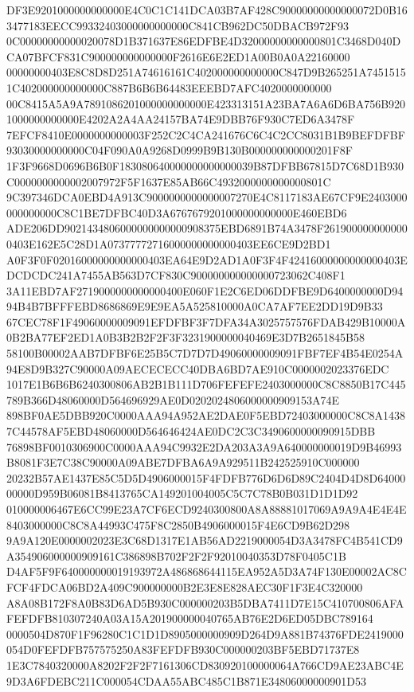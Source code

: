 \documentclass[UTF8,fontset=fandol,zihao=-4,a4paper]{ctexart}
\begin{document}
{{DF3E9201000000000000E4C0C1C141DCA03B7AF428C90000000000000072D0B163477183EECC99332403000000000000C841CB962DC50DBACB972F93
0C00000000000020078D1B371637E86EDFBE4D32000000000000801C3468D040DCA07BFCF831C900000000000000F2616E6E2ED1A00B0A0A22160000
00000000403E8C8D8D251A74616161C402000000000000C847D9B265251A74515151C402000000000000C887B6B6B64483EEEBD7AFC4020000000000
00C8415A5A9A7891086201000000000000E423313151A23BA7A6A6D6BA756B9201000000000000E4202A2A4AA24157BA74E9DBB76F930C7ED6A3478F
7EFCF8410E0000000000003F252C2C4CA241676C6C4C2CC8031B1B9BEFDFBF93030000000000C04F090A0A9268D0999B9B130B000000000000201F8F
1F3F9668D0696B6B0F183080640000000000000039B87DFBB67815D7C68D1B930C0000000000002007972F5F1637E85AB66C4932000000000000801C
9C397346DCA0EBD4A913C9000000000000007270E4C8117183AE67CF9E2403000000000000C8C1BE7DFBC40D3A6767679201000000000000E460EBD6
ADE206DD9021434806000000000000908375EBD6891B74A3478F2619000000000000403E162E5C28D1A07377772716000000000000403EE6CE9D2BD1
A0F3F0F02016000000000000403EA64E9D2AD1A0F3F4F42416000000000000403EDCDCDC241A7455AB563D7CF830C900000000000000723062C408F1
3A11EBD7AF2719000000000000400E060F1E2C6ED06DDFBE9D6400000000D9494B4B7BFFFEBD8686869E9E9EA5A525810000A0CA7AF7EE2DD19D9B33
67CEC78F1F49060000009091EFDFBF3F7DFA34A3025757576FDAB429B10000A0B2BA77EF2ED1A0B3B2B2F2F3F3231900000040469E3D7B2651845B58
58100B00002AAB7DFBF6E25B5C7D7D7D49060000009091FBF7EF4B54E0254A94E8D9B327C90000A09AECECECC40DBA6BD7AE910C0000002023376EDC
1017E1B6B6B6240300806AB2B1B111D706FEFEFE2403000000C8C8850B17C445789B366D48060000D564696929AE0D0202024806000000909153A74E
898BF0AE5DBB920C0000AAA94A952AE2DAE0F5EBD72403000000C8C8A14387C44578AF5EBD48060000D564646424AE0DC2C3C3490600000090915DBB
76898BF0010306900C0000AAA94C9932E2DA203A3A9A640000000019D9B46993B8081F3E7C38C90000A09ABE7DFBA6A9A929511B242525910C000000
20232B57AE1437E85C5D5D4906000015F4FDFB776D6D6D89C2404D4D8D6400000000D959B06081B8413765CA149201004005C5C7C78B0B031D1D1D92
010000006467E6CC99E23A7CF6ECD9240300800A8A88881017069A9A9A4E4E4E8403000000C8C8A44993C475F8C2850B4906000015F4E6CD9B62D298
9A9A120E0000002023E3C68D1317E1AB56AD2219000054D3A3478FC4B541CD9A354906000000909161C386898B702F2F2F92010040353D78F0405C1B
D4AF5F9F640000000019193972A486868644115EA952A5D3A74F130E00002AC8CFCF4FDCA06BD2A409C900000000B2E3E8E828AEC30F1F3E4C320000
A8A08B172F8A0B83D6AD5B930C000000203B5DBA7411D7E15C410700806AFAFEFDFB810307240A03A15A201900000040765AB76E2D6ED05DBC789164
0000504D870F1F96280C1C1D1D8905000000909D264D9A881B74376FDE2419000054D0FEFDFB757575250A83FEFDFB930C000000203BF5EBD71737E8
1E3C7840320000A8202F2F2F7161306CD830920100000064A766CD9AE23ABC4E9D3A6FDEBC211C000054CDAA55ABC485C1B871E34806000000901D53
}}
\end{document}
